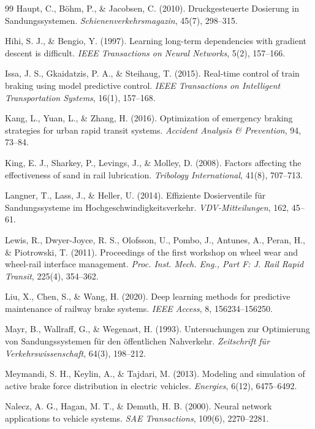 \documentclass[a4paper,12pt]{article}
\theoremstyle{definition}
\begin{document}
\begin{thebibliography}{99}
 Haupt, C., Böhm, P., \& Jacobsen, C. (2010). Druckgesteuerte Dosierung in Sandungssystemen. \textit{Schienenverkehrsmagazin}, 45(7), 298--315.

 Hihi, S. J., \& Bengio, Y. (1997). Learning long-term dependencies with gradient descent is difficult. \textit{IEEE Transactions on Neural Networks}, 5(2), 157--166.

 Issa, J. S., Gkaidatzis, P. A., \& Steihaug, T. (2015). Real-time control of train braking using model predictive control. \textit{IEEE Transactions on Intelligent Transportation Systems}, 16(1), 157--168.

 Kang, L., Yuan, L., \& Zhang, H. (2016). Optimization of emergency braking strategies for urban rapid transit systems. \textit{Accident Analysis \& Prevention}, 94, 73--84.

 King, E. J., Sharkey, P., Levings, J., \& Molley, D. (2008). Factors affecting the effectiveness of sand in rail lubrication. \textit{Tribology International}, 41(8), 707--713.

 Langner, T., Lass, J., \& Heller, U. (2014). Effiziente Dosierventile für Sandungssysteme im Hochgeschwindigkeitsverkehr. \textit{VDV-Mitteilungen}, 162, 45--61.

 Lewis, R., Dwyer-Joyce, R. S., Olofsson, U., Pombo, J., Antunes, A., Peran, H., \& Piotrowski, T. (2011). Proceedings of the first workshop on wheel wear and wheel-rail interface management. \textit{Proc. Inst. Mech. Eng., Part F: J. Rail Rapid Transit}, 225(4), 354--362.

 Liu, X., Chen, S., \& Wang, H. (2020). Deep learning methods for predictive maintenance of railway brake systems. \textit{IEEE Access}, 8, 156234--156250.

 Mayr, B., Wallraff, G., \& Wegenast, H. (1993). Untersuchungen zur Optimierung von Sandungssystemen für den öffentlichen Nahverkehr. \textit{Zeitschrift für Verkehrswissenschaft}, 64(3), 198--212.

 Meymandi, S. H., Keylin, A., \& Tajdari, M. (2013). Modeling and simulation of active brake force distribution in electric vehicles. \textit{Energies}, 6(12), 6475--6492.

 Nalecz, A. G., Hagan, M. T., \& Demuth, H. B. (2000). Neural network applications to vehicle systems. \textit{SAE Transactions}, 109(6), 2270--2281.


\end{thebibliography}
\end{document}
